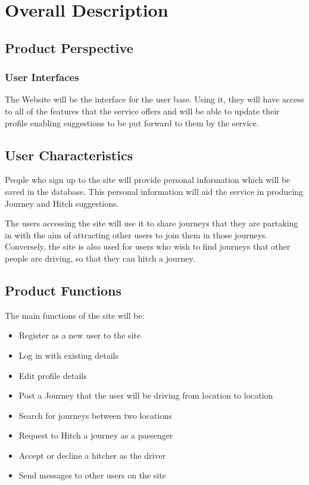 \documentclass[11pt]{article}
\begin{document}
\section{Overall Description}
\subsection{Product Perspective}
\subsubsection{User Interfaces}
The Website will be the interface for the user base. Using it, they will have access to all of the features that the service offers and will be able to update their profile enabling suggestions to be put forward to them by the service.

\subsection{User Characteristics}
People who sign up to the site will provide personal information which will be saved in the database. This personal information will aid the service in producing Journey and Hitch suggestions. 

The users accessing the site will use it to share journeys that they are partaking in with the aim of attracting other users to join them in those journeys. Conversely, the site is also used for users who wish to find journeys that other people are driving, so that they can hitch a journey.

\subsection{Product Functions}
The main functions of the site will be:
\begin{itemize}
\item Register as a new user to the site
\item Log in with existing details
\item Edit profile details
\item Post a Journey that the user will be driving from location to location
\item Search for journeys between two locations
\item Request to Hitch a journey as a passenger
\item Accept or decline a hitcher as the driver
\item Send messages to other users on the site
\end{itemize}
\end{document}
